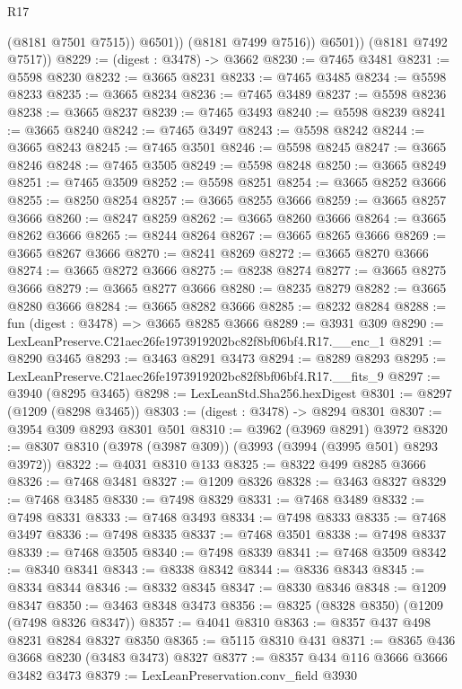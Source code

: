 \begin{lexlean}{R17}
\begin{coremodule}
                  (@8181 @7501 @7515))
                @6501))
            (@8181 @7499 @7516))
          @6501))
      (@8181 @7492 @7517))
@8229 := (digest : @3478) -> @3662
@8230 := @7465 @3481
@8231 := @5598 @8230
@8232 := @3665 @8231
@8233 := @7465 @3485
@8234 := @5598 @8233
@8235 := @3665 @8234
@8236 := @7465 @3489
@8237 := @5598 @8236
@8238 := @3665 @8237
@8239 := @7465 @3493
@8240 := @5598 @8239
@8241 := @3665 @8240
@8242 := @7465 @3497
@8243 := @5598 @8242
@8244 := @3665 @8243
@8245 := @7465 @3501
@8246 := @5598 @8245
@8247 := @3665 @8246
@8248 := @7465 @3505
@8249 := @5598 @8248
@8250 := @3665 @8249
@8251 := @7465 @3509
@8252 := @5598 @8251
@8254 := @3665 @8252 @3666
@8255 := @8250 @8254
@8257 := @3665 @8255 @3666
@8259 := @3665 @8257 @3666
@8260 := @8247 @8259
@8262 := @3665 @8260 @3666
@8264 := @3665 @8262 @3666
@8265 := @8244 @8264
@8267 := @3665 @8265 @3666
@8269 := @3665 @8267 @3666
@8270 := @8241 @8269
@8272 := @3665 @8270 @3666
@8274 := @3665 @8272 @3666
@8275 := @8238 @8274
@8277 := @3665 @8275 @3666
@8279 := @3665 @8277 @3666
@8280 := @8235 @8279
@8282 := @3665 @8280 @3666
@8284 := @3665 @8282 @3666
@8285 := @8232 @8284
@8288 := fun (digest : @3478) => @3665 @8285 @3666
@8289 := @3931 @309
@8290 := LexLeanPreserve.C21aec26fe1973919202bc82f8bf06bf4.R17.__enc_1
@8291 := @8290 @3465
@8293 := @3463 @8291 @3473
@8294 := @8289 @8293
@8295 := LexLeanPreserve.C21aec26fe1973919202bc82f8bf06bf4.R17.__fits_9
@8297 := @3940 (@8295 @3465)
@8298 := LexLeanStd.Sha256.hexDigest
@8301 := @8297 (@1209 (@8298 @3465))
@8303 := (digest : @3478) -> @8294 @8301
@8307 := @3954 @309 @8293 @8301 @501
@8310 := @3962 (@3969 @8291) @3972
@8320 := @8307 @8310 (@3978 (@3987 @309)) (@3993 (@3994 (@3995 @501) @8293 @3972))
@8322 := @4031 @8310 @133
@8325 := @8322 @499 @8285 @3666
@8326 := @7468 @3481
@8327 := @1209 @8326
@8328 := @3463 @8327
@8329 := @7468 @3485
@8330 := @7498 @8329
@8331 := @7468 @3489
@8332 := @7498 @8331
@8333 := @7468 @3493
@8334 := @7498 @8333
@8335 := @7468 @3497
@8336 := @7498 @8335
@8337 := @7468 @3501
@8338 := @7498 @8337
@8339 := @7468 @3505
@8340 := @7498 @8339
@8341 := @7468 @3509
@8342 := @8340 @8341
@8343 := @8338 @8342
@8344 := @8336 @8343
@8345 := @8334 @8344
@8346 := @8332 @8345
@8347 := @8330 @8346
@8348 := @1209 @8347
@8350 := @3463 @8348 @3473
@8356 := @8325 (@8328 @8350) (@1209 (@7498 @8326 @8347))
@8357 := @4041 @8310
@8363 := @8357 @437 @498 @8231 @8284 @8327 @8350
@8365 := @5115 @8310 @431
@8371 := @8365 @436 @3668 @8230 (@3483 @3473) @8327
@8377 := @8357 @434 @116 @3666 @3666 @3482 @3473
@8379 := LexLeanPreservation.conv_field @3930

\end{coremodule}
\end{lexlean}
